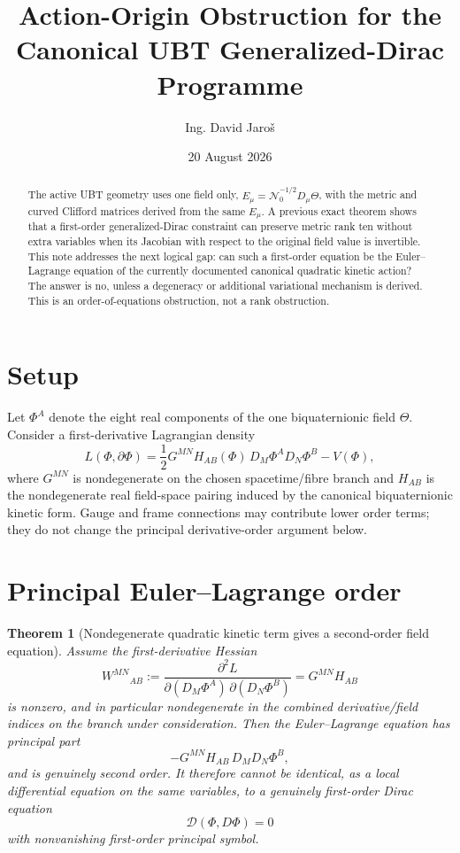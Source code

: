 \documentclass[11pt,a4paper]{article}
\title{Action-Origin Obstruction for the Canonical UBT Generalized-Dirac Programme}
\author{Ing. David Jaro\v{s}}
\date{20 August 2026}
\newtheorem{theorem}{Theorem}
\begin{document}
\maketitle

\begin{abstract}
The active UBT geometry uses one field only,
$E_\mu=\mathcal N_0^{-1/2}D_\mu\Theta$, with the metric and curved Clifford
matrices derived from the same $E_\mu$.  A previous exact theorem shows that a
first-order generalized-Dirac constraint can preserve metric rank ten without
extra variables when its Jacobian with respect to the original field value is
invertible.  This note addresses the next logical gap: can such a first-order
equation be the Euler--Lagrange equation of the currently documented canonical
quadratic kinetic action?  The answer is no, unless a degeneracy or additional
variational mechanism is derived.  This is an order-of-equations obstruction,
not a rank obstruction.
\end{abstract}

\section{Setup}
Let $\Phi^A$ denote the eight real components of the one biquaternionic field
$\Theta$.  Consider a first-derivative Lagrangian density
\[
L(\Phi,\partial\Phi)=\frac12
G^{MN}H_{AB}(\Phi)\,D_M\Phi^A D_N\Phi^B-V(\Phi),
\]
where $G^{MN}$ is nondegenerate on the chosen spacetime/fibre branch and
$H_{AB}$ is the nondegenerate real field-space pairing induced by the canonical
biquaternionic kinetic form.  Gauge and frame connections may contribute lower
order terms; they do not change the principal derivative-order argument below.

\section{Principal Euler--Lagrange order}
\begin{theorem}[Nondegenerate quadratic kinetic term gives a second-order field equation]
Assume the first-derivative Hessian
\[
W^{MN}{}_{AB}:=\frac{\partial^2L}
{\partial(D_M\Phi^A)\,\partial(D_N\Phi^B)}
=G^{MN}H_{AB}
\]
is nonzero, and in particular nondegenerate in the combined derivative/field
indices on the branch under consideration.  Then the Euler--Lagrange equation
has principal part
\[
-G^{MN}H_{AB}\,D_MD_N\Phi^B,
\]
and is genuinely second order.  It therefore cannot be identical, as a local
differential equation on the same variables, to a genuinely first-order
Dirac equation
\[
\mathcal D(\Phi,D\Phi)=0
\]
with nonvanishing first-order principal symbol.
\end{theorem}
\end{document}
